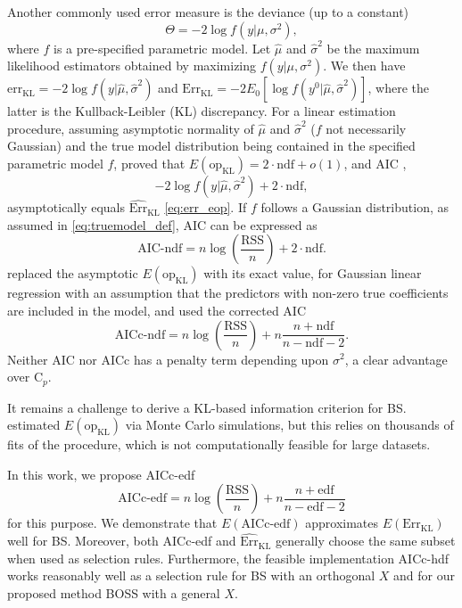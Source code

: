 Another commonly used error measure is the deviance (up to a constant)
\begin{equation}
\Theta = -2 \log f(y|\mu,\sigma^2),
\label{eq:deviance_def}
\end{equation}
where $f$ is a pre-specified parametric model. Let $\hat{\mu}$ and $\hat{\sigma}^2$ be the maximum likelihood estimators obtained by maximizing $f(y|\mu,\sigma^2)$. We then have $\text{err}_{\text{KL}} = -2 \log f (y|\hat{\mu},\hat{\sigma}^2)$ and $\text{Err}_{\text{KL}}  = -2 E_0 \left[ \log f(y^0|\hat{\mu},\hat{\sigma}^2)\right] $, where the latter is the Kullback-Leibler (KL) discrepancy. For a linear estimation procedure, assuming asymptotic normality of $\hat{\mu}$ and $\hat{\sigma}^2$ ($f$ not necessarily Gaussian) and the true model distribution being contained in the specified parametric model $f$, \citet{konishi2008information} proved that $E(\text{op}_{\text{KL}}) = 2 \cdot \text{ndf} + o(1)$, and AIC \citep{Akaike1973},
\begin{equation*}
-2 \log f (y|\hat{\mu},\hat{\sigma}^2) + 2 \cdot \text{ndf},
\end{equation*}
asymptotically equals $\widehat{\text{Err}}_\text{KL}$ \eqref{eq:err_eop}. If $f$ follows a Gaussian distribution, as assumed in \eqref{eq:truemodel_def}, AIC can be expressed as
\begin{equation*}
\text{AIC-ndf} = n \log\left(\frac{\text{RSS}}{n}\right) + 2 \cdot \text{ndf}.
\end{equation*}
\citet{Hurvich1989} replaced the asymptotic $E(\text{op}_\text{KL})$ with its exact value, for Gaussian linear regression with an assumption that the predictors with non-zero true coefficients are included in the model, and used the corrected AIC
\begin{equation*}
\text{AICc-ndf} = n \log\left(\frac{\text{RSS}}{n}\right) + n \frac{n+\text{ndf}}{n-\text{ndf}-2}.
\label{eq:aicc_ndf}
\end{equation*}
Neither AIC nor AICc has a penalty term depending upon $\sigma^2$, a clear advantage over C$_p$.

It remains a challenge to derive a KL-based information criterion for BS. \citet{Liao2018} estimated $E(\text{op}_{\text{KL}})$ via Monte Carlo simulations, but this relies on thousands of fits of the procedure, which is not computationally feasible for large datasets. 

In this work, we propose AICc-edf
\begin{equation}
\text{AICc-edf} = n \log\left(\frac{\text{RSS}}{n}\right) + n \frac{n+\text{edf}}{n-\text{edf}-2}
\label{eq:aicc_edf}
\end{equation}
for this purpose. We demonstrate that $E(\text{AICc-edf})$ approximates $E(\text{Err}_\text{KL})$ well for BS. Moreover, both AICc-edf and $\widehat{\text{Err}}_\text{KL}$ generally choose the same subset when used as selection rules. Furthermore, the feasible implementation AICc-hdf works reasonably well as a selection rule for BS with an orthogonal $X$ and for our proposed method BOSS with a general $X$. 

